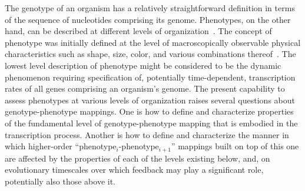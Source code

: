 The genotype of an organism has a relatively straightforward definition in terms of the sequence of nucleotides comprising its genome. Phenotypes, on the other hand, can be described at different levels of organization~\cite{Dawkins1982,Stadler2001}. The concept of phenotype was initially defined at the level of macroscopically observable physical characteristics such as shape, size, color, and various combinations thereof~\cite{Johannsen1911}. The lowest level description of phenotype might be considered to be the dynamic phenomenon requiring specification of, potentially time-dependent, transcription rates of all genes comprising an organism's genome. The present capability to assess phenotypes at various levels of organization raises several questions about genotype-phenotype mappings. One is how to define and characterize properties of the fundamental level of genotype-phenotype mapping that is embodied in the transcription process. Another is how to define and characterize the manner in which higher-order ``phenotype$_i$-phenotype$_{i+1}$'' mappings built on top of this one are affected by the properties of each of the levels existing below, and, on evolutionary timescales over which feedback may play a significant role, potentially also those above it.


